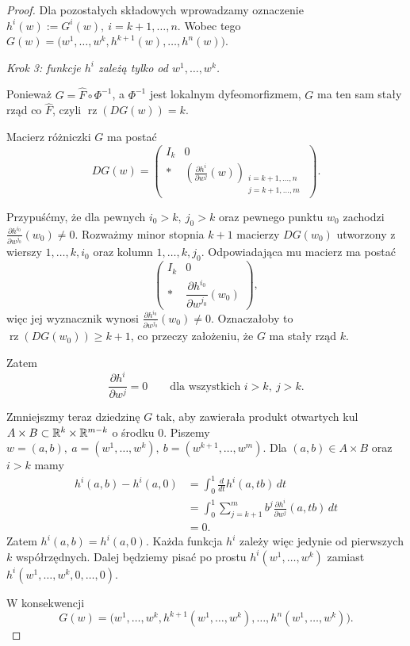 \begin{proof}
Dla pozostałych składowych wprowadzamy oznaczenie $h^i(w):=G^i(w), \ i=k+1,\dots,n$.
Wobec tego $G(w) = \bigl( w^1,\dots,w^k, h^{k+1}(w),\dots,h^n(w) \bigr)$.

\medskip
\emph{Krok 3: funkcje $h^i$ zależą tylko od
$w^1,\dots,w^k$.}

Ponieważ $G=\widehat F\circ\Phi^{-1}$,
a $\Phi^{-1}$ jest lokalnym dyfeomorfizmem, $G$ ma ten sam
stały rząd co $\widehat F$, czyli $\operatorname{rz}(DG(w))=k$.

Macierz różniczki $G$ ma postać
\[
DG(w)
=
\begin{pmatrix}
I_k&0\\
*&
\left(
\frac{\partial h^i}{\partial w^j}(w)
\right)_{\substack{i=k+1,\dots,n\\ j=k+1,\dots,m}}
\end{pmatrix}.
\]

Przypuśćmy, że dla pewnych $i_0>k, \ j_0>k$
oraz pewnego punktu $w_0$ zachodzi $\frac{\partial h^{i_0}}{\partial w^{j_0}}(w_0)\neq0$.
Rozważmy minor stopnia $k+1$ macierzy $DG(w_0)$ utworzony
z wierszy $1,\dots,k,i_0$
oraz kolumn $1,\dots,k,j_0$.
Odpowiadająca mu macierz ma postać
\[
\begin{pmatrix}
I_k&0\\
*&
\dfrac{\partial h^{i_0}}{\partial w^{j_0}}(w_0)
\end{pmatrix},
\]
więc jej wyznacznik wynosi $\frac{\partial h^{i_0}}{\partial w^{j_0}}(w_0)\neq0$.
Oznaczałoby to $\operatorname{rz}(DG(w_0))\geq k+1$,
co przeczy założeniu, że $G$ ma stały rząd $k$.

Zatem
\[
\frac{\partial h^i}{\partial w^j}=0
\qquad
\text{dla wszystkich }i>k,\ j>k.
\]

Zmniejszmy teraz dziedzinę $G$ tak, aby zawierała produkt
otwartych kul $A\times B \subset \mathbb{R}^k\times\mathbb{R}^{m-k}$
o środku $0$. Piszemy $w=(a,b), \ a=(w^1,\dots,w^k), \ b=(w^{k+1},\dots,w^m)$.
Dla $(a,b)\in A\times B$ oraz $i>k$ mamy
\begin{align*}
h^i(a,b)-h^i(a,0)
&=
\int_0^1
\frac{d}{dt}h^i(a,tb)\,dt\\
&=
\int_0^1
\sum_{j=k+1}^m
b^j
\frac{\partial h^i}{\partial w^j}(a,tb)\,dt\\
&=
0.
\end{align*}
Zatem $h^i(a,b)=h^i(a,0)$.
Każda funkcja $h^i$ zależy więc jedynie od pierwszych $k$
współrzędnych. Dalej będziemy pisać po prostu $h^i(w^1,\dots,w^k)$
zamiast $h^i(w^1,\dots,w^k,0,\dots,0)$.

W konsekwencji
\[
G(w) = \bigl( w^1,\dots,w^k, h^{k+1}(w^1,\dots,w^k), \dots, h^n(w^1,\dots,w^k) \bigr).
\]


\end{proof}
